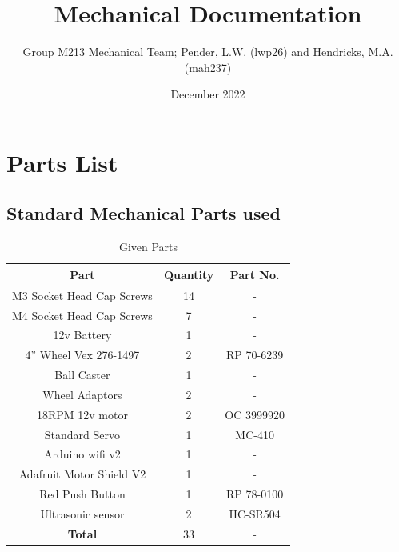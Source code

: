 \documentclass{article}
\title{Mechanical Documentation}
\author{Group M213 Mechanical Team; Pender, L.W. (lwp26) and Hendricks, M.A. (mah237)}
\date{December 2022}
\begin{document}
\maketitle

\newpage

\section{Parts List}

\subsection{Standard Mechanical Parts used}

\begin{table}[h]
    \centering
    \begin{tabular}{|c|c|c|}
        \hline
        \textbf{Part} & \textbf{Quantity} & \textbf{Part No.} \\ \hline
        \hline
        M3 Socket Head Cap Screws & 14 & -\\
        \hline
        M4 Socket Head Cap Screws & 7 & -\\
        \hline
        12v Battery & 1 & -\\ 
        \hline
        4” Wheel Vex 276-1497 & 2 & RP 70-6239\\
        \hline
        Ball Caster & 1 & -\\
        \hline
        Wheel Adaptors & 2 & -\\
        \hline
        18RPM 12v motor & 2 & OC 3999920\\
        \hline
        Standard Servo & 1 & MC-410 \\
        \hline
        Arduino wifi v2 & 1 & - \\
        \hline
        Adafruit Motor Shield V2 & 1 & - \\
        \hline
        Red Push Button & 1 & RP 78-0100\\
        \hline
        Ultrasonic sensor & 2 & HC-SR504\\
        \hline
        \textbf{Total} & 33 & -\\ \hline
    \end{tabular}
    \caption{Given Parts}
    \label{tab:given_parts}
\end{table}
\end{document}
